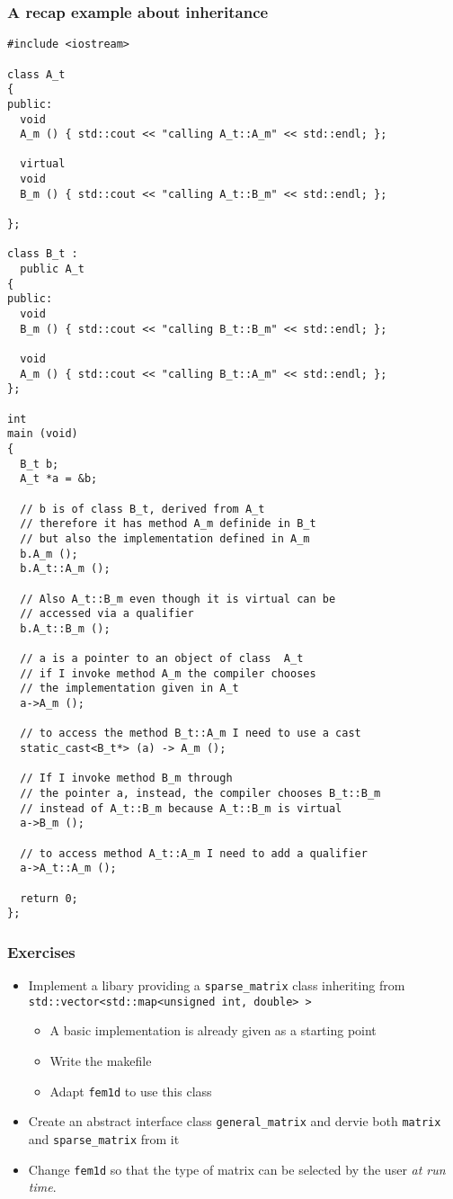 \documentclass[smaller,a4paper]{beamer}
\newcommand{\cpp}[1]{\lstinline!#1!}
\begin{document}
\begin{frame}
\frametitle{A recap example about inheritance}
\begin{lstlisting}
#include <iostream>

class A_t
{
public:
  void 
  A_m () { std::cout << "calling A_t::A_m" << std::endl; };
  
  virtual 
  void 
  B_m () { std::cout << "calling A_t::B_m" << std::endl; };

};

class B_t :
  public A_t
{
public:
  void 
  B_m () { std::cout << "calling B_t::B_m" << std::endl; };

  void 
  A_m () { std::cout << "calling B_t::A_m" << std::endl; };
};

int 
main (void)
{
  B_t b;
  A_t *a = &b;

  // b is of class B_t, derived from A_t 
  // therefore it has method A_m definide in B_t
  // but also the implementation defined in A_m
  b.A_m ();
  b.A_t::A_m ();

  // Also A_t::B_m even though it is virtual can be
  // accessed via a qualifier
  b.A_t::B_m ();

  // a is a pointer to an object of class  A_t
  // if I invoke method A_m the compiler chooses
  // the implementation given in A_t
  a->A_m ();

  // to access the method B_t::A_m I need to use a cast
  static_cast<B_t*> (a) -> A_m ();

  // If I invoke method B_m through
  // the pointer a, instead, the compiler chooses B_t::B_m
  // instead of A_t::B_m because A_t::B_m is virtual
  a->B_m ();

  // to access method A_t::A_m I need to add a qualifier
  a->A_t::A_m ();

  return 0;
};
\end{lstlisting}

\end{frame}

\begin{frame}\frametitle{Exercises}
\begin{itemize}
\item Implement a libary providing a \cpp{sparse_matrix} class inheriting 
      from \cpp{std::vector<std::map<unsigned int, double> >}
\begin{itemize}
\item A basic implementation is already given as a starting point
\item Write the makefile
\item Adapt \cpp{fem1d} to use this class
\end{itemize}
\item Create an abstract interface class \cpp{general_matrix} and dervie
both \cpp{matrix} and \cpp{sparse_matrix} from it
\item Change \cpp{fem1d} so that the type of matrix can be selected by the user \emph{at run time}.
\end{itemize}

\end{frame}
\end{document}
